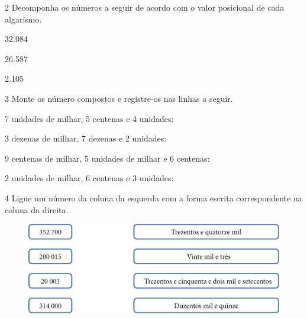 \num{2} Decomponha os números a seguir de acordo com o valor posicional de cada
algarismo.

\begin{escolha}
\item 32.084


\item
  26.587

  
\item
  2.105

\end{escolha}


\num{3} Monte os número compostos e registre-os nas linhas a seguir.

\begin{escolha}
\item
  7 unidades de milhar, 5 centenas e 4 unidades: 

\item
  3 dezenas de milhar, 7 dezenas e 2 unidades: 

\item
  9 centenas de milhar, 5 unidades de milhar e 6 centenas: 

\item
  2 unidades de milhar, 6 centenas e 3 unidades: \reduline{2.603\hfill}
\end{escolha}


\num{4} Ligue um número da coluna da esquerda com a forma escrita correspondente na coluna da direita.

\begin{figure}[htpb!]
\centering
\includegraphics[width=\textwidth]{media/image6.png}
\end{figure}

